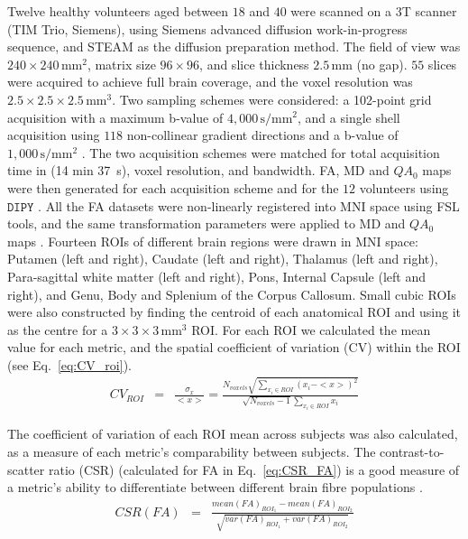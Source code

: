 \documentclass{bioinfo}
\begin{document}
Twelve healthy volunteers aged between $18$ and $40$ were scanned
on a 3T scanner (TIM Trio, Siemens), using Siemens advanced diffusion
work-in-progress sequence, and STEAM \cite{merboldt1992diffusion,MAB04}
as the diffusion preparation method. The field of view was $240\times240\,\textrm{mm}^{2}$,
matrix size $96\times96$, and slice thickness $2.5\,\textrm{mm}$
(no gap). $55$ slices were acquired to achieve full brain coverage,
and the voxel resolution was $2.5\times2.5\times2.5\,\textrm{mm}^{3}$.
Two sampling schemes were considered: a 102-point grid acquisition
with a maximum b-value of $4,000\,\textrm{s}/\textrm{mm}^{2}$, and
a single shell acquisition using $118$ non-collinear gradient directions
and a b-value of $1,000\,\textrm{s}/\textrm{mm}^{2}$ \cite{correia_garyfallidis2011}.
The two acquisition schemes were matched for total acquisition time
in (14 min 37~s), voxel resolution, and bandwidth. FA, MD and $QA_{0}$
maps were then generated for each acquisition scheme and for the $12$
volunteers using $\texttt{DIPY}$ \cite{garyfallidis2011dipy}. All
the FA datasets were non-linearly registered into MNI space using
FSL tools, and the same transformation parameters were applied to
MD and $QA_{0}$ maps . Fourteen ROIs of different brain regions were
drawn in MNI space: Putamen (left and right), Caudate (left and right),
Thalamus (left and right), Para-sagittal white matter (left and right),
Pons, Internal Capsule (left and right), and Genu, Body and Splenium
of the Corpus Callosum. Small cubic ROIs were also constructed by
finding the centroid of each anatomical ROI and using it as the centre
for a $3\times3\times3\,\mathrm{mm}^{3}$ ROI. For each ROI we calculated
the mean value for each metric, and the spatial coefficient of variation
(CV) within the ROI (see Eq.~\ref{eq:CV_roi}). \begin{eqnarray}
CV_{ROI} & = & \frac{\sigma_{x}}{<x>}=\frac{N_{voxels}\sqrt{\sum_{x_{i}\in ROI}(x_{i}-<x>)^{2}}}{\sqrt{N_{voxels}-1}\sum_{x_{i}\in ROI}x_{i}}\label{eq:CV_roi}\end{eqnarray}


The coefficient of variation of each ROI mean across subjects was
also calculated, as a measure of each metric\textquoteright{}s comparability
between subjects. The contrast-to-scatter ratio (CSR) (calculated
for FA in Eq.~\ref{eq:CSR_FA}) is a good measure of a metric\textquoteright{}s
ability to differentiate between different brain fibre populations
\cite{correia_garyfallidis2011}. \begin{eqnarray}
CSR(FA) & = & \frac{mean(FA)_{ROI_{1}}-mean(FA)_{ROI_{2}}}{\sqrt{var(FA)_{ROI_{1}}+var(FA)_{ROI_{2}}}}\label{eq:CSR_FA}\end{eqnarray}
\end{document}
